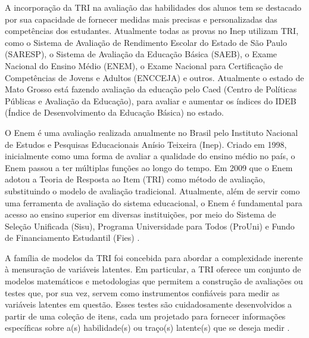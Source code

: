 A incorporação da TRI na avaliação das habilidades dos alunos tem se destacado por sua capacidade de fornecer medidas mais precisas e personalizadas das competências dos estudantes. Atualmente todas as provas no Inep utilizam TRI, como o Sistema de Avaliação de Rendimento Escolar do Estado de São Paulo (SARESP), o Sistema de Avaliação da Educação Básica (SAEB), o Exame Nacional do Ensino Médio (ENEM), o Exame Nacional para Certificação de Competências de Jovens e Adultos (ENCCEJA) e outros. Atualmente o estado de Mato Grosso está fazendo avaliação da educação pelo Caed (Centro de Políticas Públicas e Avaliação da Educação), para avaliar e aumentar os índices do IDEB (Índice de Desenvolvimento da Educação Básica) no estado.

O Enem é uma avaliação realizada anualmente no Brasil pelo Instituto Nacional de Estudos e Pesquisas Educacionais Anísio Teixeira (Inep). Criado em 1998, inicialmente como uma forma de avaliar a qualidade do ensino médio no país, o Enem passou a ter múltiplas funções ao longo do tempo. Em 2009 que o Enem adotou a Teoria de Resposta ao Item (TRI) como método de avaliação, substituindo o modelo de avaliação tradicional. Atualmente, além de servir como uma ferramenta de avaliação do sistema educacional, o Enem é fundamental para acesso ao ensino superior em diversas instituições, por meio do Sistema de Seleção Unificada (Sisu), Programa Universidade para Todos (ProUni) e Fundo de Financiamento Estudantil (Fies) \cite{inephistorico}.


A família de modelos da TRI foi concebida para abordar a complexidade inerente à mensuração de variáveis latentes. Em particular, a TRI oferece um conjunto de modelos matemáticos e metodologias que permitem a construção de avaliações ou testes que, por sua vez, servem como instrumentos confiáveis para medir as variáveis latentes em questão. Esses testes são cuidadosamente desenvolvidos a partir de uma coleção de itens, cada um projetado para fornecer informações específicas sobre a(s) habilidade(s) ou traço(s) latente(s) que se deseja medir \cite{pasquali2018}.
  

\begin{comment}
	Atualmente, o Enem é dividido em 5 partes, a redação e 4 áreas de conhecimento: Linguagens, Ciências Humanas, Matemática e Ciências da Natureza. Cada uma dessas áreas é considerado como uma habilidade $\theta$. O ENEM estima cada uma dessas habilidades separadamente. Considerando que cada área está medindo o mesmo $\theta$ \cite{inep2021}.
	
	
	Além disso, ao utilizar modelos estatísticos sofisticados, a TRI é capaz de estimar as habilidades latentes dos alunos de forma mais precisa, levando em consideração a dificuldade dos itens e a capacidade discriminativa de cada questão. Dessa forma, a TRI oferece uma abordagem mais justa e confiável para avaliar o progresso dos alunos, fornecendo informações valiosas que podem ser usadas para direcionar o ensino, identificar alunos que precisam de apoio adicional e melhorar o currículo escolar. Consequentemente, a TRI desempenha um papel essencial na promoção de práticas educacionais eficazes e na melhoria contínua da qualidade da educação.
	
\end{comment}


